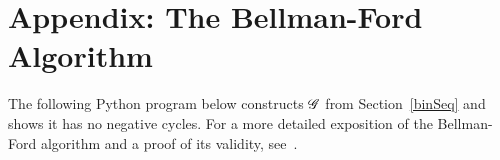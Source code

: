 \section*{Appendix: The Bellman-Ford Algorithm} \label{bfAlg}
The following Python program below constructs $\mathscr{G}$ from Section~\ref{binSeq}
and shows it has no negative cycles. For a more detailed exposition of the
Bellman-Ford algorithm and a proof of its validity, see~\cite{bellmanford}.

\bigskip
\footnotesize

\normalsize
